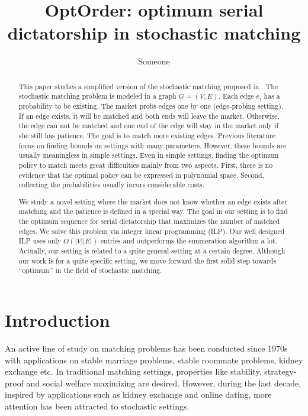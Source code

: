 \documentclass[letterpaper]{article}
\title {OptOrder: optimum serial dictatorship in stochastic matching}
\author {Someone}
\begin{document}
%

\maketitle
\begin{abstract}
This paper studies a simplified version of the stochastic matching proposed in \cite{chen2009approximating}.
The stochastic matching problem is modeled in a graph $G=(V,E)$. 
Each edge $e_i$ has a probability to be existing. 
The market probs edges one by one (edge-probing setting).
If an edge exists, it will be matched and both ends will leave the market.
Otherwise, the edge can not be matched and one end of the edge will stay in the market only if she still has patience.
The goal is to match more existing edges.
Previous literature focus on finding bounds on settings with many parameters.
However, these bounds are usually meaningless in simple settings.
Even in simple settings, finding the optimum policy to match meets great difficulties mainly from two aspects.
First, there is no evidence that the optimal policy can be expressed in polynomial space.
Second, collecting the probabilities usually incurs considerable costs.

We study a novel setting where the market does not know whether an edge exists after matching and the patience is defined in a special way.
The goal in our setting is to find the optimum sequence for serial dictatorship that maximizes the number of matched edges.
We solve this problem via integer linear programming (ILP).
Our well designed ILP uses only $O(|V||E|)$ entries and outperforms the enumeration algorithm a lot.
Actually, our setting is related to a quite general setting  at a certain degree.
Although our work is for a quite specific setting, we move forward the first solid step towards ``optimum'' in the field of stochastic matching.

\end{abstract}

\section{Introduction}

An active line of study on matching problems has been conducted since 1970s~\cite{keylist} with applications on stable marriage problems, stable roommate problems, kidney exchange etc.
In traditional matching settings, properties like stability, strategy-proof and social welfare maximizing are desired.
However, during the last decade, inspired by applications such as kidney exchange and online dating, more attention has been attracted to stochastic settings.
\end{document}

